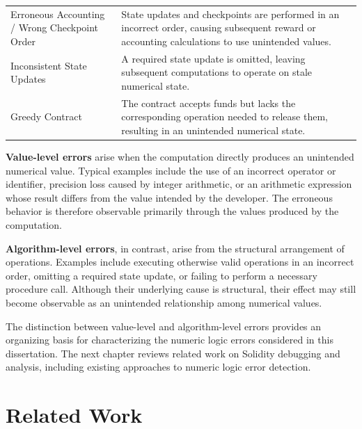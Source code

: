 \documentclass[11pt,oneside]{report}
\theoremstyle{plain}
\theoremstyle{definition}
\theoremstyle{remark}
\begin{document}
\begin{table}[t]
\begin{tabular}{@{}p{}p{}@{}}
Erroneous Accounting / Wrong Checkpoint Order~\citep{gptscan,exploitablebugs}
& State updates and checkpoints are performed in an incorrect order, causing subsequent reward or accounting calculations to use unintended values. \\

Inconsistent State Updates~\citep{exploitablebugs}
& A required state update is omitted, leaving subsequent computations to operate on stale numerical state. \\

Greedy Contract~\citep{flyinointment}
& The contract accepts funds but lacks the corresponding operation needed to release them, resulting in an unintended numerical state. \\

\bottomrule
\end{tabular}
\end{table}

\textbf{Value-level errors} arise when the computation directly produces an unintended numerical value.
Typical examples include the use of an incorrect operator or identifier, precision loss caused by integer arithmetic, or an arithmetic expression whose result differs from the value intended by the developer.
The erroneous behavior is therefore observable primarily through the values produced by the computation.

\textbf{Algorithm-level errors}, in contrast, arise from the structural arrangement of operations.
Examples include executing otherwise valid operations in an incorrect order, omitting a required state update, or failing to perform a necessary procedure call.
Although their underlying cause is structural, their effect may still become observable as an unintended relationship among numerical values.

The distinction between value-level and algorithm-level errors provides an organizing basis for characterizing the numeric logic errors considered in this dissertation.
The next chapter reviews related work on Solidity debugging and analysis, including existing approaches to numeric logic error detection.


\chapter{Related Work}\label{chap:related}
\end{document}
